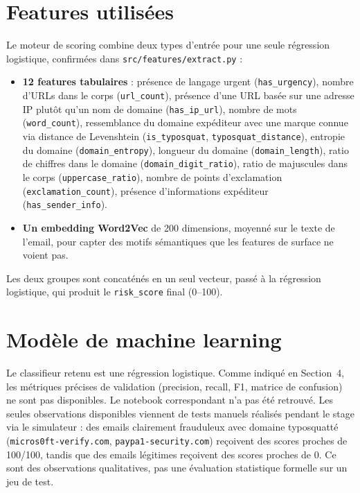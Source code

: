 \documentclass[12pt,a4paper]{report}
\begin{document}
\section{Features utilisées}

Le moteur de scoring combine deux types d'entrée pour une seule régression logistique, confirmées dans \texttt{src/features/extract.py} :

\begin{itemize}[nosep]
\item \textbf{12 features tabulaires} : présence de langage urgent (\texttt{has\_urgency}), nombre d'URLs dans le corps (\texttt{url\_count}), présence d'une URL basée sur une adresse IP plutôt qu'un nom de domaine (\texttt{has\_ip\_url}), nombre de mots (\texttt{word\_count}), ressemblance du domaine expéditeur avec une marque connue via distance de Levenshtein (\texttt{is\_typosquat}, \texttt{typosquat\_distance}), entropie du domaine (\texttt{domain\_entropy}), longueur du domaine (\texttt{domain\_length}), ratio de chiffres dans le domaine (\texttt{domain\_digit\_ratio}), ratio de majuscules dans le corps (\texttt{uppercase\_ratio}), nombre de points d'exclamation (\texttt{exclamation\_count}), présence d'informations expéditeur (\texttt{has\_sender\_info}).
\item \textbf{Un embedding Word2Vec} de 200 dimensions, moyenné sur le texte de l'email, pour capter des motifs sémantiques que les features de surface ne voient pas.
\end{itemize}

Les deux groupes sont concaténés en un seul vecteur, passé à la régression logistique, qui produit le \texttt{risk\_score} final (0--100).

\section{Modèle de machine learning}

Le classifieur retenu est une régression logistique. Comme indiqué en Section~4, les métriques précises de validation (precision, recall, F1, matrice de confusion) ne sont pas disponibles. Le notebook correspondant n'a pas été retrouvé. Les seules observations disponibles viennent de tests manuels réalisés pendant le stage via le simulateur : des emails clairement frauduleux avec domaine typosquatté (\texttt{micros0ft-verify.com}, \texttt{paypa1-security.com}) reçoivent des scores proches de 100/100, tandis que des emails légitimes reçoivent des scores proches de 0. Ce sont des observations qualitatives, pas une évaluation statistique formelle sur un jeu de test.
\end{document}
